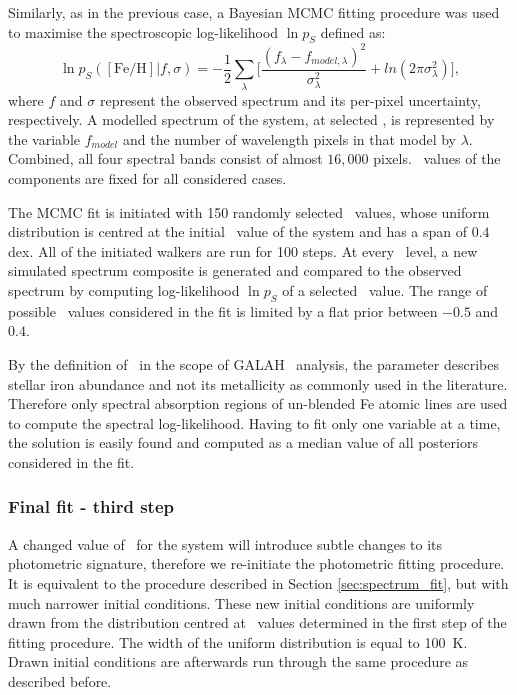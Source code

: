 Similarly, as in the previous case, a Bayesian MCMC fitting procedure was used to maximise the spectroscopic \hbox{log-likelihood} $\ln p_{S}$ defined as:
\begin{equation}
	\label{equ:lnp_s}
	\ln p_{S}(\mathrm{[Fe/H]} | f, \sigma) = -\frac{1}{2} \sum_{\lambda}^{} \Big[ \frac{(f_{\lambda} - f_{model, \lambda})^2}{\sigma_{\lambda}^2} +ln(2\pi\sigma_{\lambda}^2) \Big],
\end{equation}
where $f$ and $\sigma$ represent the observed spectrum and its per-pixel uncertainty, respectively. A modelled spectrum of the system, at selected \Feh, is represented by the variable $f_{model}$ and the number of wavelength pixels in that model by $\lambda$. Combined, all four spectral bands consist of almost $16,000$ pixels. \Teff\ values of the components are fixed for all considered cases.

The MCMC fit is initiated with 150 randomly selected \Feh\ values, whose uniform distribution is centred at the initial \Feh\ value of the system and has a span of $0.4$ dex. All of the initiated walkers are run for 100 steps. At every \Feh\ level, a new simulated spectrum composite is generated and compared to the observed spectrum by computing log-likelihood $\ln p_{S}$ of a selected \Feh\ value. The range of possible \Feh\ values considered in the fit is limited by a flat prior between $-0.5$ and $0.4$. 

By the definition of \Feh\ in the scope of GALAH \TC\ analysis, the parameter describes stellar iron abundance and not its metallicity as commonly used in the literature. Therefore only spectral absorption regions of un-blended Fe atomic lines are used to compute the spectral log-likelihood. Having to fit only one variable at a time, the solution is easily found and computed as a median value of all posteriors considered in the fit.

\subsubsection{Final fit - third step}
\label{sec:final_fit}
A changed value of \Feh\ for the system will introduce subtle changes to its photometric signature, therefore we re-initiate the photometric fitting procedure. It is equivalent to the procedure described in Section \ref{sec:spectrum_fit}, but with much narrower initial conditions. These new initial conditions are uniformly drawn from the distribution centred at \Teff\ values determined in the first step of the fitting procedure. The width of the uniform distribution is equal to 100~K. Drawn initial conditions are afterwards run through the same procedure as described before.

